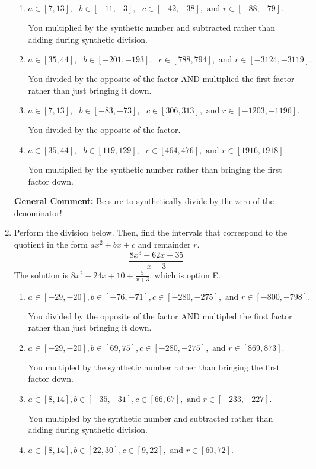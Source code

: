 \documentclass{extbook}[14pt]
\newcommand{\litem}[1]{\item #1

\rule{\textwidth}{0.4pt}}
\begin{document}
\begin{enumerate}
{\begin{enumerate}[label=\Alph*.]
* This is the solution!
\item \( a \in [7, 13], \text{   } b \in [-11, -3], \text{   } c \in [-42, -38], \text{   and   } r \in [-88, -79]. \)

 You multiplied by the synthetic number and subtracted rather than adding during synthetic division.
\item \( a \in [35, 44], \text{   } b \in [-201, -193], \text{   } c \in [788, 794], \text{   and   } r \in [-3124, -3119]. \)

 You divided by the opposite of the factor AND multiplied the first factor rather than just bringing it down.
\item \( a \in [7, 13], \text{   } b \in [-83, -73], \text{   } c \in [306, 313], \text{   and   } r \in [-1203, -1196]. \)

 You divided by the opposite of the factor.
\item \( a \in [35, 44], \text{   } b \in [119, 129], \text{   } c \in [464, 476], \text{   and   } r \in [1916, 1918]. \)

 You multiplied by the synthetic number rather than bringing the first factor down.
\end{enumerate}

\textbf{General Comment:} Be sure to synthetically divide by the zero of the denominator!
}
\litem{
Perform the division below. Then, find the intervals that correspond to the quotient in the form $ax^2+bx+c$ and remainder $r$.
\[ \frac{8x^{3} -62 x + 35}{x + 3} \]The solution is \( 8x^{2} -24 x + 10 + \frac{5}{x + 3} \), which is option E.\begin{enumerate}[label=\Alph*.]
\item \( a \in [-29, -20], b \in [-76, -71], c \in [-280, -275], \text{ and } r \in [-800, -798]. \)

 You divided by the opposite of the factor AND multipled the first factor rather than just bringing it down.
\item \( a \in [-29, -20], b \in [69, 75], c \in [-280, -275], \text{ and } r \in [869, 873]. \)

 You multipled by the synthetic number rather than bringing the first factor down.
\item \( a \in [8, 14], b \in [-35, -31], c \in [66, 67], \text{ and } r \in [-233, -227]. \)

 You multipled by the synthetic number and subtracted rather than adding during synthetic division.
\item \( a \in [8, 14], b \in [22, 30], c \in [9, 22], \text{ and } r \in [60, 72]. \)


\end{enumerate}}
\end{enumerate}
\end{document}
